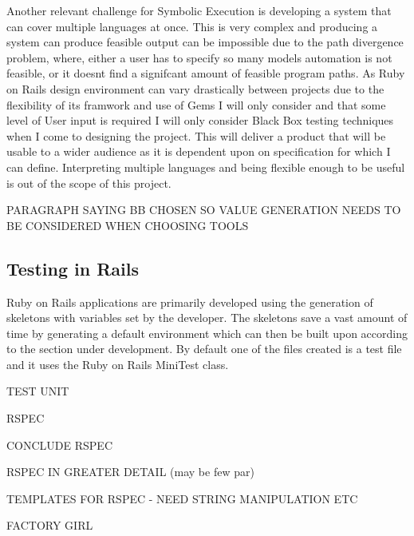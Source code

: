 \documentclass[a4paper,12pt]{article}
\begin{document}
\vspace{5mm}
\par Another relevant challenge for Symbolic Execution is developing a system that can cover multiple languages at once. This is very complex and producing a system can produce feasible output can be impossible due to the path divergence problem, where, either a user has to specify so many models automation is not feasible, or it doesnt find a signifcant amount of feasible program paths. As Ruby on Rails design environment can vary drastically between projects due to the flexibility of its framwork and use of Gems I will only consider and that some level of User input is required I will only consider Black Box testing techniques when I come to designing the project. This will deliver a product that will be usable to a wider audience as it is dependent upon on specification for which I can define. Interpreting multiple languages and being flexible enough to be useful is out of the scope of this project.
\vspace{5mm}
\par PARAGRAPH SAYING BB CHOSEN SO VALUE GENERATION NEEDS TO BE CONSIDERED WHEN CHOOSING TOOLS

\subsection{Testing in Rails}

\par Ruby on Rails applications are primarily developed using the generation of skeletons with variables set by the developer. The skeletons save a vast amount of time by generating a default environment which can then be built upon according to the section under development. By default one of the files created is a test file and it uses the Ruby on Rails MiniTest class.\cite{railsTest}

\par TEST UNIT

\par RSPEC

\par CONCLUDE RSPEC

\par RSPEC IN GREATER DETAIL (may be few par)

\par TEMPLATES FOR RSPEC - NEED STRING MANIPULATION ETC

\par FACTORY GIRL
\end{document}
